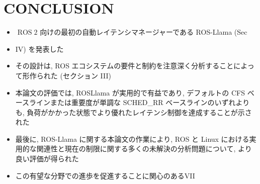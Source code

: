 
\section{CONCLUSION}
\label{sec: conclusion}

\begin{frame}{}
    \begin{itemize}
        \item  $\operatorname{ROS} 2$ 向けの最初の自動レイテンシマネージャーである ROS-Llama (Sec
\item IV) を発表した
\item その設計は, ROS エコシステムの要件と制約を注意深く分析することによって形作られた (セクション III)
\item 本論文の評価では, ROSLlama が実用的で有益であり, デフォルトの CFS ベースラインまたは重要度が単調な SCHED\_RR ベースラインのいずれよりも, 負荷がかかった状態でより優れたレイテンシ制御を達成することが示された
\item 最後に, ROS-Llama に関する本論文の作業により, ROS と Linux における実用的な関連性と現在の制限に関する多くの未解決の分析問題について, より良い評価が得られた
\item この有望な分野での進歩を促進することに関心のあるVII
    \end{itemize}
\end{frame}
